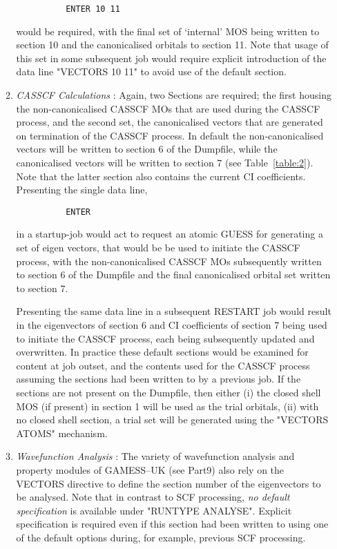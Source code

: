 \documentclass[11pt,fleqn]{article}
\begin{document}
\begin{itemize}
\begin{enumerate}
{
\footnotesize
\begin{verbatim}
          ENTER 10 11
\end{verbatim}
}
would be required, with the final set of `internal' MOS being written to
section 10 and the canonicalised orbitals to section 11.  Note that usage
of this set in some subsequent job would require explicit introduction
of the data line "VECTORS 10 11" to avoid use of the default section.

\item {\em CASSCF Calculations} : Again, two Sections are required;
the first housing the non-canonicalised CASSCF MOs that are used during
the CASSCF process, and the second set, the canonicalised vectors that
are generated on termination of the CASSCF process.  In default the
non-canonicalised vectors will be written to section 6 of the Dumpfile,
while the canonicalised vectors will be written to section 7 (see
Table~\ref{table:2}). Note that the latter section also contains the
current CI coefficients. Presenting the single data line,

{
\footnotesize
\begin{verbatim}
          ENTER
\end{verbatim}
}
in a startup-job would act to request an atomic GUESS for generating a set
of eigen vectors, that would be be used to initiate the CASSCF process,
with the non-canonicalised CASSCF MOs subsequently written to section 6 of
the Dumpfile and the final canonicalised orbital set written to section 7.

Presenting the same data line in a subsequent RESTART job would result
in the eigenvectors of section 6 and CI coefficients of section 7 being
used to initiate the CASSCF process, each being subsequently updated
and overwritten. In practice these default sections would be examined
for content at job outset, and the contents used for the CASSCF process
assuming the sections had been written to by a previous job. If the
sections are not present on the Dumpfile, then either (i) the closed
shell MOS (if present) in section 1 will be used as the trial orbitals,
(ii) with no closed shell section, a trial set will be generated using
the "VECTORS ATOMS" mechanism.

\item {\em Wavefunction Analysis} : The variety of wavefunction
analysis and property modules of GAMESS--UK (see Part9) also rely on
the VECTORS directive to define the section number of the eigenvectors
to be analysed. Note that in contrast to SCF processing, {\em no
default specification} is available under "RUNTYPE ANALYSE". Explicit
specification is required even if this section had been written to using
one of the default options during, for example, previous SCF processing.

\end{enumerate}

\end{itemize}
\end{document}

